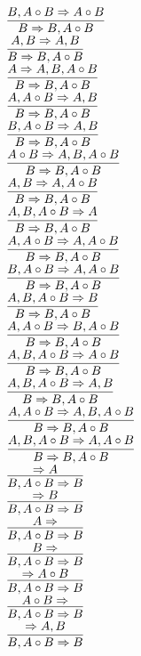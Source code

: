 \documentclass[11pt]{article}
\begin{document}
\begin{center}
\bigskip
\\$\infer{B\Rightarrow B, A\circ B}{B, A\circ B\Rightarrow A\circ B}$
\bigskip
\\$\infer{B\Rightarrow B, A\circ B}{A, B\Rightarrow A, B}$
\bigskip
\\$\infer{B\Rightarrow B, A\circ B}{A\Rightarrow A, B, A\circ B}$
\bigskip
\\$\infer{B\Rightarrow B, A\circ B}{A, A\circ B\Rightarrow A, B}$
\bigskip
\\$\infer{B\Rightarrow B, A\circ B}{B, A\circ B\Rightarrow A, B}$
\bigskip
\\$\infer{B\Rightarrow B, A\circ B}{A\circ B\Rightarrow A, B, A\circ B}$
\bigskip
\\$\infer{B\Rightarrow B, A\circ B}{A, B\Rightarrow A, A\circ B}$
\bigskip
\\$\infer{B\Rightarrow B, A\circ B}{A, B, A\circ B\Rightarrow A}$
\bigskip
\\$\infer{B\Rightarrow B, A\circ B}{A, A\circ B\Rightarrow A, A\circ B}$
\bigskip
\\$\infer{B\Rightarrow B, A\circ B}{B, A\circ B\Rightarrow A, A\circ B}$
\bigskip
\\$\infer{B\Rightarrow B, A\circ B}{A, B, A\circ B\Rightarrow B}$
\bigskip
\\$\infer{B\Rightarrow B, A\circ B}{A, A\circ B\Rightarrow B, A\circ B}$
\bigskip
\\$\infer{B\Rightarrow B, A\circ B}{A, B, A\circ B\Rightarrow A\circ B}$
\bigskip
\\$\infer{B\Rightarrow B, A\circ B}{A, B, A\circ B\Rightarrow A, B}$
\bigskip
\\$\infer{B\Rightarrow B, A\circ B}{A, A\circ B\Rightarrow A, B, A\circ B}$
\bigskip
\\$\infer{B\Rightarrow B, A\circ B}{A, B, A\circ B\Rightarrow A, A\circ B}$
\bigskip
\\$\infer{B, A\circ B\Rightarrow B}{\Rightarrow A}$
\bigskip
\\$\infer{B, A\circ B\Rightarrow B}{\Rightarrow B}$
\bigskip
\\$\infer{B, A\circ B\Rightarrow B}{A\Rightarrow }$
\bigskip
\\$\infer{B, A\circ B\Rightarrow B}{B\Rightarrow }$
\bigskip
\\$\infer{B, A\circ B\Rightarrow B}{\Rightarrow A\circ B}$
\bigskip
\\$\infer{B, A\circ B\Rightarrow B}{A\circ B\Rightarrow }$
\bigskip
\\$\infer{B, A\circ B\Rightarrow B}{\Rightarrow A, B}$

\end{center}
\end{document}
